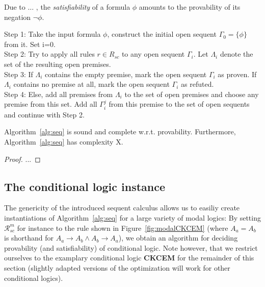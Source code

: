 \documentclass{entcs} \usepackage{entcsmacro}
\begin{document}
\begin{remark}
Due to $\ldots$  %
, the \emph{satisfiability} of a formula $\phi$ amounts to the provability
of its negation $\neg \phi$.
\label{rem:satProv}
\end{remark}

\begin{algorithm}[h]
\begin{alg}
\begin{upshape}
  Step 1: Take the input formula $\phi$, construct the initial open
  sequent $\Gamma_0 = \{\phi\}$ from it. Set i=0.\\
  Step 2: Try to apply all rules $r\in R_{sc}$ to any open sequent
  $\Gamma_i$. Let $\Lambda_i$ denote the set of the resulting open
  premises.\\
  Step 3: If $\Lambda_i$ contains the empty premise, mark the open
  sequent $\Gamma_i$ as proven. If $\Lambda_i$ contains no premise at
  all, mark the open sequent $\Gamma_i$ as refuted.\\
  Step 4: Else, add all premises from $\Lambda_i$ to the set of open
  premises and choose any premise from this set. Add all $\Gamma^j_i$
  from this premise to the set of open sequents and continue with
  Step 2.
\end{upshape}
\label{alg:seq}
\end{alg}
\end{algorithm}

\begin{proposition}
\begin{upshape}
Algorithm~\ref{alg:seq} is sound and complete w.r.t. provability. Furthermore,
Algorithm~\ref{alg:seq} has complexity X.
\end{upshape}
\end{proposition}

\begin{proof}
...
\end{proof}

\subsection{The conditional logic instance}

The genericity of the introduced sequent calculus allows us to easiliy
create instantiations of Algorithm~\ref{alg:seq} for a large variety
of modal logics:
By setting $\mathcal R^m_{sc}$ for instance to the rule shown in
Figure~\ref{fig:modalCKCEM}
(where $A_a = A_b$ is shorthand for $A_a\rightarrow A_b\wedge A_b\rightarrow A_a$), we
obtain an algorithm for deciding provability (and satisfiability) of
conditional logic. Note however, that we restrict ourselves to the
examplary conditional logic \textbf{CKCEM} for the remainder of this section
(slightly adapted versions of the optimization will work for other conditional logics).
\end{document}
